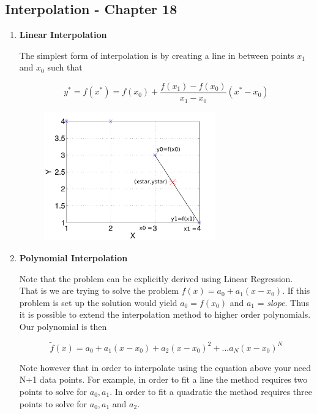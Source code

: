\subsection{Interpolation - Chapter 18}

\begin{enumerate}

\item {\bf Linear Interpolation}

The simplest form of interpolation is by creating a line in between
points $x_1$ and $x_0$ such that

\begin{equation}
y^* = f(x^*) = f(x_0) + \frac{f(x_1)-f(x_0)}{x_1-x_0}(x^*-x_0)
\end{equation}

\begin{figure}[H]
  \begin{center}
    \includegraphics[height=0.5\textwidth,width=0.7\textwidth]{Graphics/Linear_Interpolation.pdf}
  \end{center}
\end{figure}

\item {\bf Polynomial Interpolation}

Note that the problem can be explicitly derived using Linear Regression. That
is we are trying to solve the problem $f(x) = a_0 + a_1(x-x_0)$. If
this problem is set up the solution would yield
$a_0=f(x_0)$ and $a_1$ = {\it slope}. Thus it is possible to extend
the interpolation method to higher order polynomials. Our polynomial
is then

\begin{equation}
\tilde{f}(x) = a_0 + a_1 (x-x_0) + a_2 (x-x_0)^2 + ... a_N (x-x_0)^N
\end{equation}

Note however that in order to interpolate using the equation
above your need N+1 data points. For example, in order to fit a line
the method requires two points to solve for $a_0,a_1$. In order to fit
a quadratic the method requires three points to solve for $a_0,a_1$
and $a_2$.


\end{enumerate}
